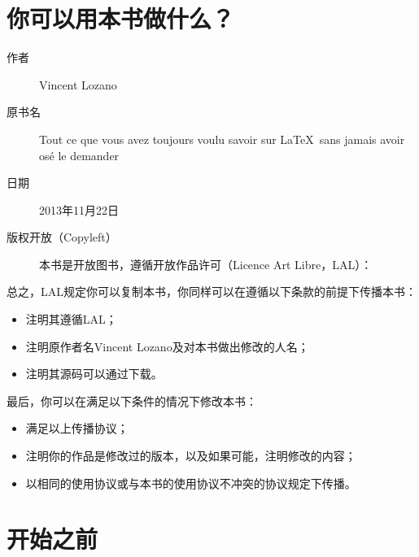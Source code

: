 \section*{你可以用本书做什么？}

\begin{description}
    \item[] 


\item[作者]Vincent Lozano
\item[原书名]Tout ce que vous avez toujours voulu savoir sur \LaTeX \ sans jamais avoir osé le demander
\item[日期]2013年11月22日
\item[版权开放（Copyleft）]本书是开放图书，遵循开放作品许可（Licence Art Libre，LAL）：

\begin{center}
\end{center}

\end{description}
总之，LAL规定你可以复制本书，你同样可以在遵循以下条款的前提下传播本书：

\begin{itemize}
    \item 注明其遵循LAL；
    \item 注明原作者名Vincent Lozano及对本书做出修改的人名；
    \item 注明其源码可以通过下载。
\end{itemize}

最后，你可以在满足以下条件的情况下修改本书：

\begin{itemize}
    \item 满足以上传播协议；
    \item 注明你的作品是修改过的版本，以及如果可能，注明修改的内容；
    \item 以相同的使用协议或与本书的使用协议不冲突的协议规定下传播。
\end{itemize}

\section*{开始之前}

